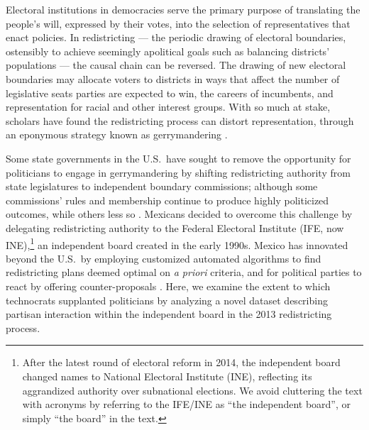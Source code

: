 \documentclass[letter,12pt]{article}
\begin{document}

\onehalfspacing

Electoral institutions in democracies serve the primary purpose of translating the people's will, expressed by their votes, into the selection of representatives that enact policies. In redistricting --- the periodic drawing of electoral boundaries, ostensibly to achieve seemingly apolitical goals such as balancing districts' populations --- the causal chain can be reversed. The drawing of new electoral boundaries may allocate voters to districts in ways that affect the number of legislative seats parties are expected to win, the careers of incumbents, and representation for racial and other interest groups. With so much at stake, scholars have found the redistricting process can distort representation, through an eponymous strategy known as gerrymandering \citep{mayhew1974vanishingMg,cox.katz.2002,erikson1972malapportionment,engstrom2006redisttrictApsr}. 

Some state governments in the U.S.\ have sought to remove the opportunity for politicians to engage in gerrymandering by shifting redistricting authority from state legislatures to independent boundary commissions; although some commissions' rules and membership continue to produce highly politicized outcomes, while others less so \citep{mcdonald.CommVsLegisRedistrict2004,trelles.mtz.polygob2012}. Mexicans decided to overcome this challenge by delegating redistricting authority to the Federal Electoral Institute (IFE, now INE),\footnote{After the latest round of electoral reform in 2014, the independent board changed names to National Electoral Institute (INE), reflecting its aggrandized authority over subnational elections. We avoid cluttering the text with acronyms by referring to the IFE/INE as ``the independent board'', or simply ``the board'' in the text.} an independent board created in the early 1990s. Mexico has innovated beyond the U.S.\ by employing customized automated algorithms to find redistricting plans deemed optimal on \emph{a priori} criteria, and for political parties to react by offering counter-proposals \citep{trelles.mtz.polygob2012}. Here, we examine the extent to which technocrats supplanted politicians \citep{lujambio.vives.2008} by analyzing a novel dataset describing partisan interaction within the independent board in the 2013 redistricting process.
\end{document}
